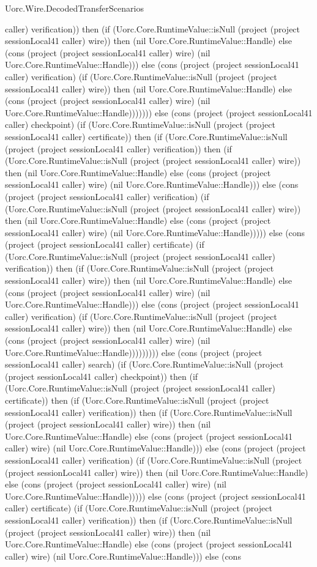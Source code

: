 \begin{lexlean}{Uorc.Wire.DecodedTransferScenarios}
\begin{semanticmodule}
{caller) verification)) then (if (Uorc.Core.RuntimeValue::isNull (project (project sessionLocal41 caller) wire)) then (nil Uorc.Core.RuntimeValue::Handle) else (cons (project (project sessionLocal41 caller) wire) (nil Uorc.Core.RuntimeValue::Handle))) else (cons (project (project sessionLocal41 caller) verification) (if (Uorc.Core.RuntimeValue::isNull (project (project sessionLocal41 caller) wire)) then (nil Uorc.Core.RuntimeValue::Handle) else (cons (project (project sessionLocal41 caller) wire) (nil Uorc.Core.RuntimeValue::Handle))))))) else (cons (project (project sessionLocal41 caller) checkpoint) (if (Uorc.Core.RuntimeValue::isNull (project (project sessionLocal41 caller) certificate)) then (if (Uorc.Core.RuntimeValue::isNull (project (project sessionLocal41 caller) verification)) then (if (Uorc.Core.RuntimeValue::isNull (project (project sessionLocal41 caller) wire)) then (nil Uorc.Core.RuntimeValue::Handle) else (cons (project (project sessionLocal41 caller) wire) (nil Uorc.Core.RuntimeValue::Handle))) else (cons (project (project sessionLocal41 caller) verification) (if (Uorc.Core.RuntimeValue::isNull (project (project sessionLocal41 caller) wire)) then (nil Uorc.Core.RuntimeValue::Handle) else (cons (project (project sessionLocal41 caller) wire) (nil Uorc.Core.RuntimeValue::Handle))))) else (cons (project (project sessionLocal41 caller) certificate) (if (Uorc.Core.RuntimeValue::isNull (project (project sessionLocal41 caller) verification)) then (if (Uorc.Core.RuntimeValue::isNull (project (project sessionLocal41 caller) wire)) then (nil Uorc.Core.RuntimeValue::Handle) else (cons (project (project sessionLocal41 caller) wire) (nil Uorc.Core.RuntimeValue::Handle))) else (cons (project (project sessionLocal41 caller) verification) (if (Uorc.Core.RuntimeValue::isNull (project (project sessionLocal41 caller) wire)) then (nil Uorc.Core.RuntimeValue::Handle) else (cons (project (project sessionLocal41 caller) wire) (nil Uorc.Core.RuntimeValue::Handle))))))))) else (cons (project (project sessionLocal41 caller) search) (if (Uorc.Core.RuntimeValue::isNull (project (project sessionLocal41 caller) checkpoint)) then (if (Uorc.Core.RuntimeValue::isNull (project (project sessionLocal41 caller) certificate)) then (if (Uorc.Core.RuntimeValue::isNull (project (project sessionLocal41 caller) verification)) then (if (Uorc.Core.RuntimeValue::isNull (project (project sessionLocal41 caller) wire)) then (nil Uorc.Core.RuntimeValue::Handle) else (cons (project (project sessionLocal41 caller) wire) (nil Uorc.Core.RuntimeValue::Handle))) else (cons (project (project sessionLocal41 caller) verification) (if (Uorc.Core.RuntimeValue::isNull (project (project sessionLocal41 caller) wire)) then (nil Uorc.Core.RuntimeValue::Handle) else (cons (project (project sessionLocal41 caller) wire) (nil Uorc.Core.RuntimeValue::Handle))))) else (cons (project (project sessionLocal41 caller) certificate) (if (Uorc.Core.RuntimeValue::isNull (project (project sessionLocal41 caller) verification)) then (if (Uorc.Core.RuntimeValue::isNull (project (project sessionLocal41 caller) wire)) then (nil Uorc.Core.RuntimeValue::Handle) else (cons (project (project sessionLocal41 caller) wire) (nil Uorc.Core.RuntimeValue::Handle))) else (cons }
\end{semanticmodule}
\end{lexlean}
